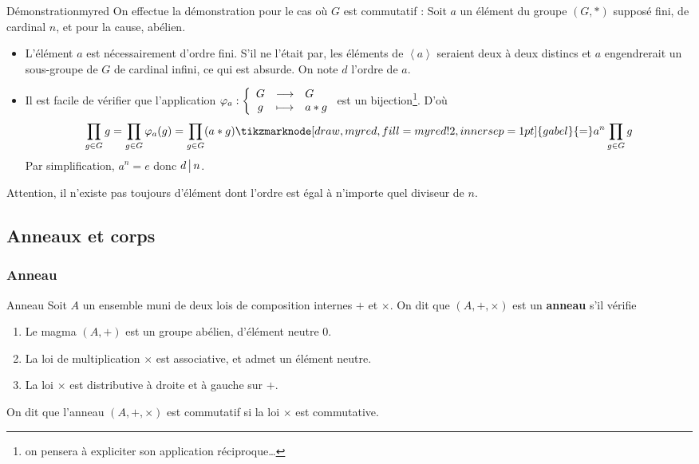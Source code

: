     \begin{demo}{Démonstration}{myred}
        On effectue la démonstration pour le cas où $G$ est commutatif : Soit $a$ un élément du groupe $(G,*)$ supposé fini, de cardinal $n$, et pour la cause, abélien.
        \begin{itemize}
            \item L’élément $a$ est nécessairement d’ordre fini. S’il ne l’était par, les éléments de $\left< a \right>$ seraient deux à deux distincs et $a$ engendrerait un sous-groupe de $G$ de cardinal infini, ce qui est absurde. On note $d$ l’ordre de $a$.
            \item Il est facile de vérifier que l’application $\fonction{\varphi_a}{G}{G}{g}{a * g}$ est un bijection\footnote{on pensera à expliciter son application réciproque\ldots}. D’où 
            \[ \prod_{g \in G} g = \prod_{g \in G} \varphi_a(g) = \prod_{g \in G} (a * g) \tikzmarknode[draw, myred, fill=myred!2, inner sep=1pt]{gabel}{=} a^n \prod_{g \in G} g \]   
            Par simplification, $a^n = e$ donc $d \, \big| \, n$.
        \end{itemize}
    \end{demo}

    Attention, il n’existe pas toujours d’élément dont l’ordre est égal à n’importe quel diviseur de $n$.

\subsection{Anneaux et corps}

    \subsubsection{Anneau}

    \begin{defi}{Anneau}{}
        Soit $A$ un ensemble muni de deux lois de composition internes $+$ et $\times$. On dit que $(A,+,\times)$ est un \textbf{anneau} s’il vérifie 
        \begin{enumerate}[label=$(h_{\alph*})$]
            \item Le magma $(A,+)$ est un groupe abélien, d’élément neutre $0$.
            \item La loi de multiplication $\times$ est associative, et admet un élément neutre.
            \item La loi $\times$ est distributive à droite et à gauche sur $+$.
        \end{enumerate}
        On dit que l’anneau $(A,+,\times)$ est commutatif si la loi $\times$ est commutative.
    \end{defi}

